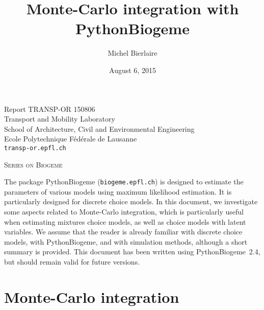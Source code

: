 \documentclass[12pt,a4paper]{article}
\title{Monte-Carlo integration with PythonBiogeme}
\author{Michel Bierlaire}
\date{August 6, 2015}
\newcommand{\PBIOGEME}{PythonBiogeme}
\begin{document}
\begin{titlepage}
\pagestyle{empty}

\maketitle
\vspace{2cm}

\begin{center}
\small Report TRANSP-OR 150806 \\ Transport and Mobility Laboratory \\ School of Architecture, Civil and Environmental Engineering \\ Ecole Polytechnique F\'ed\'erale de Lausanne \\ \verb+transp-or.epfl.ch+
\begin{center}
\textsc{Series on Biogeme}
\end{center}
\end{center}


\clearpage
\end{titlepage}

The package PythonBiogeme (\texttt{biogeme.epfl.ch}) is designed to estimate the parameters of
various models using maximum likelihood estimation. It is particularly
designed for discrete choice models. In this document, we investigate
some aspects related to Monte-Carlo integration, which is particularly
useful when estimating mixtures choice models, as well as choice
models with latent variables. We assume that the reader is already
familiar with discrete choice models, with \PBIOGEME, and with
simulation methods, although a short summary is provided.  This document has been written using
\PBIOGEME\ 2.4, but should remain valid for future versions.  

\section{Monte-Carlo integration}
\end{document}
